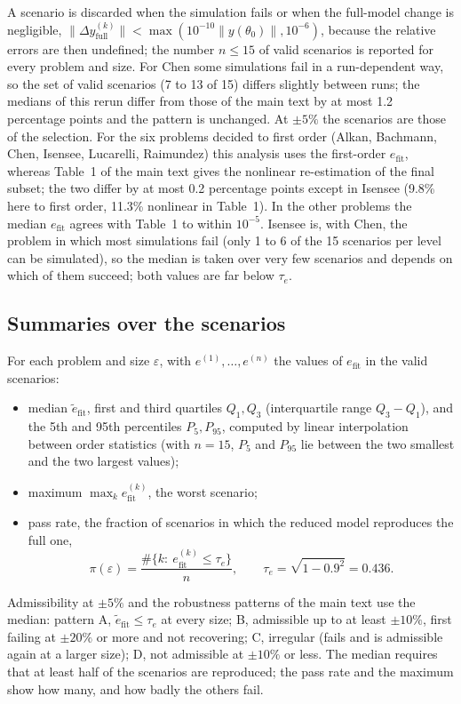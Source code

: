 A scenario is discarded when the simulation fails or when the full-model change is negligible, $\|\Delta y^{(k)}_{\mathrm{full}}\|<\max(10^{-10}\|y(\theta_0)\|,10^{-6})$, because the relative errors are then undefined; the number $n\le15$ of valid scenarios is reported for every problem and size. For Chen some simulations fail in a run-dependent way, so the set of valid scenarios (7 to 13 of 15) differs slightly between runs; the medians of this rerun differ from those of the main text by at most 1.2 percentage points and the pattern is unchanged. At $\pm5\%$ the scenarios are those of the selection. For the six problems decided to first order (Alkan, Bachmann, Chen, Isensee, Lucarelli, Raimundez) this analysis uses the first-order $e_{\mathrm{fit}}$, whereas Table~1 of the main text gives the nonlinear re-estimation of the final subset; the two differ by at most 0.2 percentage points except in Isensee (9.8\% here to first order, 11.3\% nonlinear in Table~1). In the other problems the median $e_{\mathrm{fit}}$ agrees with Table~1 to within $10^{-5}$. Isensee is, with Chen, the problem in which most simulations fail (only 1 to 6 of the 15 scenarios per level can be simulated), so the median is taken over very few scenarios and depends on which of them succeed; both values are far below $\tau_e$.

\subsection*{Summaries over the scenarios}
For each problem and size $\varepsilon$, with $e^{(1)},\dots,e^{(n)}$ the values of $e_{\mathrm{fit}}$ in the valid scenarios:
\begin{itemize}\itemsep0pt
\item median $\tilde e_{\mathrm{fit}}$, first and third quartiles $Q_1,Q_3$ (interquartile range $Q_3-Q_1$), and the 5th and 95th percentiles $P_5,P_{95}$, computed by linear interpolation between order statistics (with $n=15$, $P_5$ and $P_{95}$ lie between the two smallest and the two largest values);
\item maximum $\max_k e^{(k)}_{\mathrm{fit}}$, the worst scenario;
\item pass rate, the fraction of scenarios in which the reduced model reproduces the full one,
\[ \pi(\varepsilon)=\frac{\#\{k:\ e^{(k)}_{\mathrm{fit}}\le\tau_e\}}{n},\qquad \tau_e=\sqrt{1-0.9^2}=0.436. \]
\end{itemize}
Admissibility at $\pm5\%$ and the robustness patterns of the main text use the median: pattern A, $\tilde e_{\mathrm{fit}}\le\tau_e$ at every size; B, admissible up to at least $\pm10\%$, first failing at $\pm20\%$ or more and not recovering; C, irregular (fails and is admissible again at a larger size); D, not admissible at $\pm10\%$ or less. The median requires that at least half of the scenarios are reproduced; the pass rate and the maximum show how many, and how badly the others fail.

